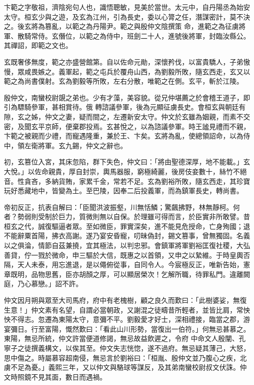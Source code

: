 \begin{pinyinscope}
 卞範之字敬祖，濟陰宛句人也，識悟聰敏，見美於當世。太元中，自丹陽丞為始安太守。桓玄少與之遊，及玄為江州，引為長史，委以心膂之任，潛謀密計，莫不決之。後玄將為篡亂，以範之為丹陽尹。範之與殷仲文陰撰策
 命，進範之為征虜將軍、散騎常侍。玄僭位，以範之為侍中，班劍二十人，進號後將軍，封臨汝縣公。其禪詔，即範之文也。



 玄既奢侈無度，範之亦盛營館第。自以佐命元勛，深懷矜伐，以富貴驕人，子弟慠慢，眾咸畏嫉之。義軍起，範之屯兵於覆舟山西，為劉毅所敗，隨玄西走，玄又以範之為尚書僕射。玄為劉毅等所敗，左右分散，唯範之在側。玄平，斬於江陵。



 殷仲文，南蠻校尉覬之弟也。少有才藻，美容貌。從兄仲堪薦之於會稽王道子，即引為驃騎參軍，甚相賞待。俄
 轉諮議參軍，後為元顯征虜長史。會桓玄與朝廷有隙，玄之姊，仲文之妻，疑而間之，左遷新安太守。仲文於玄雖為姻親，而素不交密，及聞玄平京師，便棄郡投焉。玄甚悅之，以為諮議參軍。時王謐見禮而不親，卞範之被親而少禮，而寵遇隆重，兼於王、卞矣。玄將為亂，使總領詔命，以為侍中，領左衛將軍。玄九錫，仲文之辭也。



 初，玄篡位入宮，其床忽陷，群下失色，仲文曰：「將由聖德深厚，地不能載。」玄大悅。」以佐命親貴，厚自封崇，輿馬器服，窮極綺麗，後房伎妾數十，絲竹不絕音。性貪吝，多納貨賄，家累千金，常若不足。玄為劉裕所敗，隨玄西走，其珍寶
 玩好悉藏地中，皆變為土。至巴陵，因奉二后投義軍，而為鎮軍長史，轉尚書。



 帝初反正，抗表自解曰：「臣聞洪波振壑，川無恬鱗；驚飆拂野，林無靜柯。何者？勢弱則受制於巨力，質微則無以自保。於理雖可得而言，於臣實非所敢譬。昔桓玄之代，誠復驅逼者眾。至如微臣，罪實深矣，進不能見危授命，亡身殉國；退不能辭粟首陽，拂衣高謝。遂乃宴安昏寵，叨昧偽封，錫文篡事，曾無獨固。名義以之俱淪，情節自茲兼撓，宜其極法，以判忠邪。會鎮軍將軍劉裕匡復社稷，大弘善貸，佇一戮於微命，申三驅於大信，既惠之以首領，又申之以縶維。于時皇輿否
 隔，天人未泰，用忘進退，是以僶俯從事，自同令人。今宸極反正，唯新告始，憲章既明，品物思舊，臣亦胡顏之厚，可以顯居榮次！乞解所職，待罪私門。違離闕庭，乃心慕戀。」詔不許。



 仲文因月朔與眾至大司馬府，府中有老槐樹，顧之良久而歎曰：「此樹婆娑，無復生意！」仲文素有名望，自謂必當朝政，又謝混之徒疇昔所輕者，並皆比肩，常怏怏不得志。忽遷為東陽太守，意彌不平。劉毅愛才好士，深相禮接，臨當之郡，游宴彌日。行至富陽，慨然歎曰：「看此山川形勢，當復出一伯符。」何無忌甚慕之。東陽，無忌所統，仲文許當便道修謁，無忌故益飲遲之，令府
 中命文人殷闡、孔寧子之徒撰義構文，以俟其至。仲文失志恍惚，遂不過府。無忌疑其薄己，大怒，思中傷之。時屬慕容超南侵，無忌言於劉裕曰：「桓胤、殷仲文並乃腹心之疾，北虜不足為憂。」義熙三年，又以仲文與駱球等謀反，及其弟南蠻校尉叔文伏誅。仲文時照鏡不見其面，數日而遇禍。




\end{pinyinscope}
